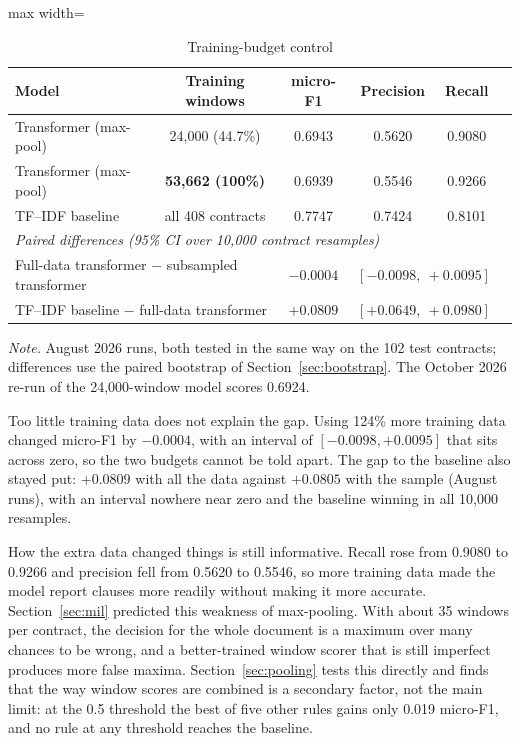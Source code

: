 \begin{table}[!htbp]
\centering
\caption{Training-budget control}
\label{tab:budget}
\small
\begin{adjustbox}{max width=\textwidth}
\begin{tabular}{lccccc}
\toprule
\textbf{Model} & \textbf{Training windows} & \textbf{micro-F1} & \textbf{Precision} & \textbf{Recall}\\
\midrule
Transformer (max-pool)  & 24{,}000 (44.7\%) & 0.6943 & 0.5620 & 0.9080\\
Transformer (max-pool)  & \textbf{53{,}662 (100\%)} & 0.6939 & 0.5546 & 0.9266\\
TF--IDF baseline        & all 408 contracts & 0.7747 & 0.7424 & 0.8101\\
\midrule
\multicolumn{5}{l}{\emph{Paired differences (95\% CI over 10{,}000 contract resamples)}}\\
\multicolumn{2}{l}{Full-data transformer $-$ subsampled transformer} & $-0.0004$ & \multicolumn{2}{l}{$[-0.0098,\ +0.0095]$}\\
\multicolumn{2}{l}{TF--IDF baseline $-$ full-data transformer} & $+0.0809$ & \multicolumn{2}{l}{$[+0.0649,\ +0.0980]$}\\
\bottomrule
\end{tabular}
\end{adjustbox}

{\footnotesize\singlespacing \emph{Note.} August 2026 runs, both tested in the same way on the 102 test contracts; differences use the paired bootstrap of Section~\ref{sec:bootstrap}. The October 2026 re-run of the 24{,}000-window model scores 0.6924.\par}
\end{table}

Too little training data does not explain the gap. Using 124\% more training data changed micro-F1 by $-0.0004$, with an interval of $[-0.0098, +0.0095]$ that sits across zero, so the two budgets cannot be told apart. The gap to the baseline also stayed put: $+0.0809$ with all the data against $+0.0805$ with the sample (August runs), with an interval nowhere near zero and the baseline winning in all 10{,}000 resamples.

How the extra data changed things is still informative. Recall rose from 0.9080 to 0.9266 and precision fell from 0.5620 to 0.5546, so more training data made the model report clauses more readily without making it more accurate. Section~\ref{sec:mil} predicted this weakness of max-pooling. With about 35 windows per contract, the decision for the whole document is a maximum over many chances to be wrong, and a better-trained window scorer that is still imperfect produces more false maxima. Section~\ref{sec:pooling} tests this directly and finds that the way window scores are combined is a secondary factor, not the main limit: at the 0.5 threshold the best of five other rules gains only 0.019 micro-F1, and no rule at any threshold reaches the baseline.

